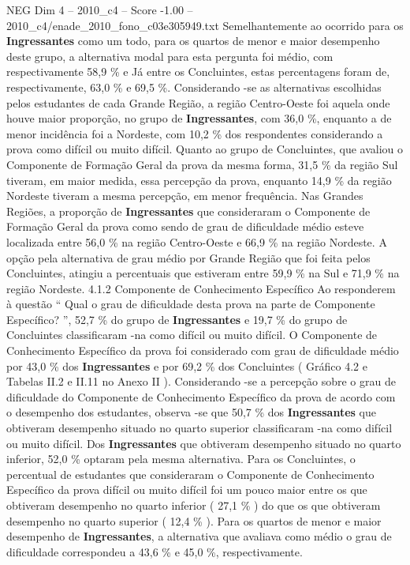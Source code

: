 \begin{textsample}{NEG Dim 4 – 2010\_c4 – Score -1.00 – 2010\_c4/enade\_2010\_fono\_c03e305949.txt}
Semelhantemente ao ocorrido para os \textbf{Ingressantes} como um todo, para os quartos de menor e maior desempenho deste grupo, a alternativa modal para esta pergunta foi médio, com respectivamente 58,9 \% e Já entre os Concluintes, estas percentagens foram de, respectivamente, 63,0 \% e 69,5 \%.
Considerando -se as alternativas escolhidas pelos estudantes de cada Grande Região, a região Centro-Oeste foi aquela onde houve maior proporção, no grupo de \textbf{Ingressantes}, com 36,0 \%, enquanto a de menor incidência foi a Nordeste, com 10,2 \% dos respondentes considerando a prova como difícil ou muito difícil.
Quanto ao grupo de Concluintes, que avaliou o Componente de Formação Geral da prova da mesma forma, 31,5 \% da região Sul tiveram, em maior medida, essa percepção da prova, enquanto 14,9 \% da região Nordeste tiveram a mesma percepção, em menor frequência.
Nas Grandes Regiões, a proporção de \textbf{Ingressantes} que consideraram o Componente de Formação Geral da prova como sendo de grau de dificuldade médio esteve localizada entre 56,0 \% na região Centro-Oeste e 66,9 \% na região Nordeste.
A opção pela alternativa de grau médio por Grande Região que foi feita pelos Concluintes, atingiu a percentuais que estiveram entre 59,9 \% na Sul e 71,9 \% na região Nordeste. 4.1.2 Componente de Conhecimento Específico Ao responderem à questão “ Qual o grau de dificuldade desta prova na parte de Componente Específico? ”, 52,7 \% do grupo de \textbf{Ingressantes} e 19,7 \% do grupo de Concluintes classificaram -na como difícil ou muito difícil.
O Componente de Conhecimento Específico da prova foi considerado com grau de dificuldade médio por 43,0 \% dos \textbf{Ingressantes} e por 69,2 \% dos Concluintes ( Gráfico 4.2 e Tabelas II.2 e II.11 no Anexo II ).
Considerando -se a percepção sobre o grau de dificuldade do Componente de Conhecimento Específico da prova de acordo com o desempenho dos estudantes, observa -se que 50,7 \% dos \textbf{Ingressantes} que obtiveram desempenho situado no quarto superior classificaram -na como difícil ou muito difícil.
Dos \textbf{Ingressantes} que obtiveram desempenho situado no quarto inferior, 52,0 \% optaram pela mesma alternativa.
Para os Concluintes, o percentual de estudantes que consideraram o Componente de Conhecimento Específico da prova difícil ou muito difícil foi um pouco maior entre os que obtiveram desempenho no quarto inferior ( 27,1 \% ) do que os que obtiveram desempenho no quarto superior ( 12,4 \% ).
Para os quartos de menor e maior desempenho de \textbf{Ingressantes}, a alternativa que avaliava como médio o grau de dificuldade correspondeu a 43,6 \% e 45,0 \%, respectivamente.

\end{textsample}
